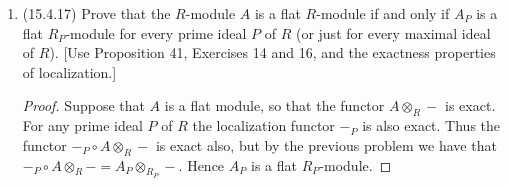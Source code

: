 \documentclass[11pt]{article}
\begin{document}
\begin{enumerate}
\begin{proof}
        To see that $\varphi$ is an isomorphism we trace through existing isomorphisms to realize $\varphi$. We have $D^{-1}M\cong D^{-1}R\otimes_R M$ and $D^{-1}N\cong D^{-1}R\otimes_R N$. Since $R, D^{-1}R$ are commutative we also have the isomorphisms giving the associativity and commutativity of the tensor products involved. In particular we have the following isomorphisms: 
        \begin{multline*}
            (D^{-1}M)\otimes_{D^{-1}R} (D^{-1}N)\cong (D^{-1}R\otimes_R M)\otimes_{D^{-1}R}(D^{-1}R\otimes_R N) \\ \cong (M\otimes_R N)\otimes_R (D^{-1}R\otimes_{D^{-1}R} D^{-1}R) \cong (M\otimes_R N)\otimes_R D^{-1}R \\ \cong D^{-1}R\otimes_R (M\otimes_R N) \cong D^{-1}(M\otimes_R N)
        \end{multline*} We outline the path of the simple tensor $(m/d)\otimes(n/e)$ in the above isomorphisms: 
        \begin{multline*}
            (m/d)\otimes(n/e) \mapsto (1/d\otimes m)\otimes (1/e\otimes n)  \\ \mapsto (m\otimes n)\otimes (1/d\otimes 1/e) \mapsto (m\otimes n)\otimes 1/de \\ \mapsto 1/de\otimes (m\otimes n) \mapsto (m\otimes n)/de
        \end{multline*} It follows that the above isomorphisms realize $\varphi$, so that $\varphi$ is an isomorphism.
    \end{proof}
    \item (15.4.17) Prove that the $R$-module $A$ is a flat $R$-module if and only if $A_P$ is a flat $R_P$-module for every prime ideal $P$ of $R$ (or just for every maximal ideal of $R$). [Use Proposition 41, Exercises 14 and 16, and the exactness properties of localization.] \begin{proof}
        Suppose that $A$ is a flat module, so that the functor $A\otimes_R -$ is exact. For any prime ideal $P$ of $R$ the localization functor $-_P$ is also exact. Thus the functor $-_P\circ A\otimes_R -$ is exact also, but by the previous problem we have that $-_P\circ A\otimes_R - = A_P\otimes_{R_P}-$. Hence $A_P$ is a flat $R_P$-module.
        

\end{proof}
\end{enumerate}
\end{document}

